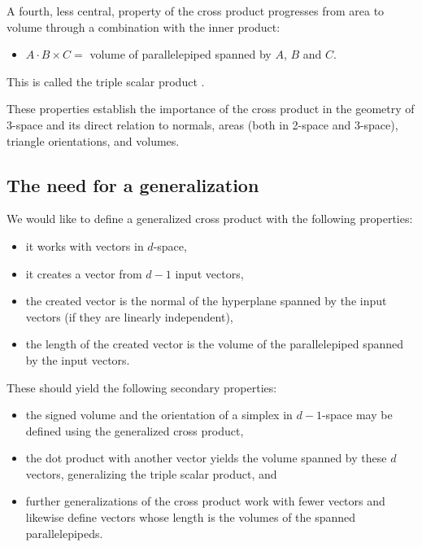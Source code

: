 \documentclass[10pt]{article}
\begin{document}
A fourth, less central, property of the cross product progresses from area to volume through 
a combination with the inner product:
\begin{itemize}
\item $A \cdot B \times C =$ volume of parallelepiped spanned by $A$, $B$ and $C$.
\end{itemize}
This is called the triple scalar product \cite{wrede72}.

These properties establish the importance of the cross product in the geometry of 3-space
and its direct relation to normals, areas (both in 2-space and 3-space),
triangle orientations, and volumes.
%

\subsection{The need for a generalization}

We would like to define a generalized cross product with the following properties:
\begin{itemize}
\item it works with vectors in $d$-space,
\item it creates a vector from $d-1$ input vectors,
\item the created vector is the normal of the hyperplane spanned by the input vectors
      (if they are linearly independent),
\item the length of the created vector is the volume of the parallelepiped spanned by the
      input vectors.
\end{itemize}
These should yield the following secondary properties:
\begin{itemize}
\item the signed volume and the orientation of a simplex in $d-1$-space may be defined 
  using the generalized cross product,
\item the dot product with another vector yields the volume spanned by these $d$ vectors,
      generalizing the triple scalar product, and
\item further generalizations of the cross product work with fewer vectors and likewise
      define vectors whose length is the volumes of the spanned parallelepipeds.
\end{itemize}
\end{document}
